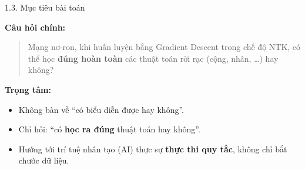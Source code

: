 \documentclass[10pt, aspectratio=169]{beamer}
\begin{document}



\begin{frame}{1.3. Mục tiêu bài toán}

    \textbf{Câu hỏi chính:}
    \begin{quote}
        Mạng nơ-ron, khi huấn luyện bằng Gradient Descent trong chế độ NTK,
        có thể học \textbf{đúng hoàn toàn} các thuật toán rời rạc
        (cộng, nhân, \ldots) hay không?
    \end{quote}
    \vspace{0.8em}
    \textbf{Trọng tâm:}
    \begin{itemize}
        \item Không bàn về “có biểu diễn được hay không”.
        \item Chỉ hỏi: “có \textbf{học ra đúng} thuật toán hay không”.
        \item Hướng tới trí tuệ nhân tạo (AI) thực sự \textbf{thực thi quy tắc}, không chỉ bắt chước dữ liệu.
    \end{itemize}

\end{frame}
\end{document}
